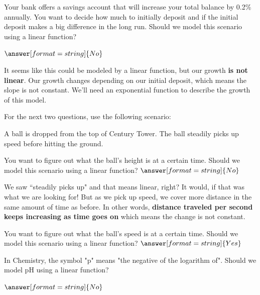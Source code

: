\documentclass{ximera}
\begin{document}
\begin{question}
Your bank offers a savings account that will increase your total balance by 0.2\% annually. You want to decide how much to initially deposit and if the initial deposit makes a big difference in the long run. Should we model this scenario using a linear function?

$\answer[format=string]{No}$

\begin{feedback}
It seems like this could be modeled by a linear function, but our growth \textbf{is not linear}. Our growth changes depending on our initial deposit, which means the slope is not constant. We'll need an exponential function to describe the growth of this model. 
\end{feedback}
\end{question}


For the next two questions, use the following scenario:

A ball is dropped from the top of Century Tower. The ball steadily picks up speed before hitting the ground. 
\begin{question}
You want to figure out what the ball's height is at a certain time. Should we model this scenario using a linear function?
$\answer[format=string]{No}$

\begin{feedback}
We saw ``steadily picks up" and that means linear, right? It would, if that was what we are looking for! But as we pick up speed, we cover more distance in the same amount of time as before. In other words, \textbf{distance traveled per second keeps increasing as time goes on} which means the change is not constant. 
\end{feedback}
\end{question}

\begin{question}
You want to figure out what the ball's speed is at a certain time. Should we model this scenario using a linear function?
$\answer[format=string]{Yes}$
\end{question}

\begin{question}
In Chemistry, the symbol "p" means "the negative of the logarithm of". Should we model pH using a linear function? 

$\answer[format=string]{No}$
\end{question}
\end{document}
